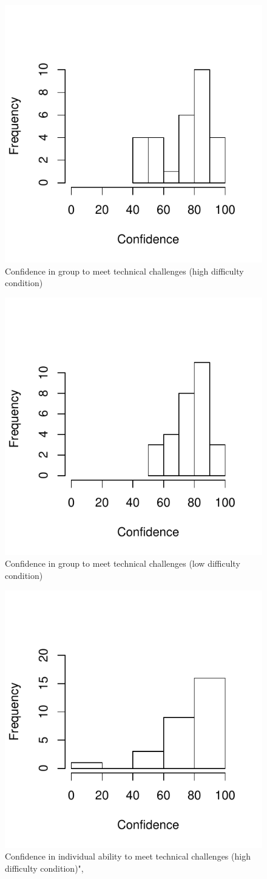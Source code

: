 \begin{figure}
  \centering
  \includegraphics[width=0.5\linewidth,keepaspectratio] {images/histHighGroupConfidence-1}
  \caption{Confidence in group to meet technical challenges (high difficulty condition)}
  \label{fig:groupConfChallengesBoxplot}
\end{figure}

\begin{figure}
  \centering
  \includegraphics[width=0.5\linewidth,keepaspectratio] {images/histLowGroupConfidence-1}
  \caption{Confidence in group to meet technical challenges (low difficulty condition)}
  \label{fig:histLowGroupConfidence}
\end{figure}

\begin{figure}
  \centering
  \includegraphics[width=0.5\linewidth,keepaspectratio] {images/histHighIndConfidence-1}
  \caption{Confidence in individual ability to meet technical challenges (high difficulty condition)",}
  \label{fig:histHighIndConfidence}
\end{figure}

